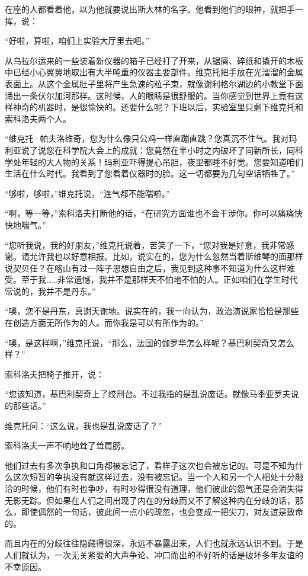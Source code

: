 在座的人都看着他，以为他就要说出斯大林的名字。他看到他们的眼神，就把手一挥，说：

“好啦，算啦，咱们上实验大厅里去吧。”

从乌拉尔运来的一些装着新仪器的箱子已经打了开来，从锯屑、碎纸和撬开的木板中已经小心翼翼地取出有大半吨重的仪器主要部件。维克托把手放在光溜溜的金属表面上。从这个金属肚子里将产生急速的粒子束，就像谢利格尔湖边的小教堂下面涌出一条伏尔加河那样。这时候，人的眼睛是很舒服的。当你感觉到世界上竟有这样神奇的机器时，是很愉快的。还要什么呢？下班以后，实验室里只剩下维克托和索科洛夫两个人。

“维克托·帕夫洛维奇，您为什么像只公鸡一样直蹦直跳？您真沉不住气。我对玛利亚说了说您在科学院大会上的成就：您竟然在半小时之内破坏了同新所长，同科学处年轻的大人物的关系！玛利亚吓得提心吊胆，夜里都睡不好觉。您要知道咱们生活在什么时代。我看到了您看着仪器时的脸。这一切都要为几句空话牺牲了。”

“够啦，够啦，”维克托说，“连气都不能喘啦。”

“啊，等一等，”索科洛夫打断他的话，“在研究方面谁也不会干涉你。你可以痛痛快快地喘气。”

“您听我说，我的好朋友，”维克托说着，苦笑了一下，“您对我是好意，我非常感谢。请允许我也以好意相报。比如，说实在的，您为什么忽然当着斯维琴的面那样说契贝任？在喀山有过一阵子思想自由之后，我见到这种事不知道为什么这样难受。至于我……非常遗憾，我并不是那样天不怕地不怕的人。正如咱们在学生时代常说的，我并不是丹东。”

“噢，您不是丹东，真谢天谢地。说实在的，我一向认为，政治演说家恰恰是那些在创造方面无所作为的人。而你我是可以有所作为的。”

“噢，是这样啊，”维克托说，“那么，法国的伽罗华怎么样呢？基巴利契奇又怎么样？”

索科洛夫把椅子推开，说：

“您该知道，基巴利契奇上了绞刑台。不过我指的是乱说废话。就像马季亚罗夫说的那些话。”

维克托问：“这么说，我也是乱说废话了？”

索科洛夫一声不响地耸了耸肩膀。

他们过去有多次争执和口角都被忘记了，看样子这次也会被忘记的。可是不知为什么这次短暂的争执没有就这样过去，没有被忘记。当一个人和另一个人相处十分融洽的时候，他们有时也争吵，有时吵得很没有道理，他们彼此的怨气还是会消失得无影无踪。但如果在人们之间出现了内在的分歧而又不了解这种内在分歧的话，那么，即使偶然的一句话，彼此间一点小的疏忽，也会变成一把尖刀，对友谊是致命的。

而且内在的分歧往往隐藏得很深，永远不暴露出来，人们也就永远认识不到。于是人们就认为，一次无关紧要的大声争论、冲口而出的不好听的话是破坏多年友谊的不幸原因。

